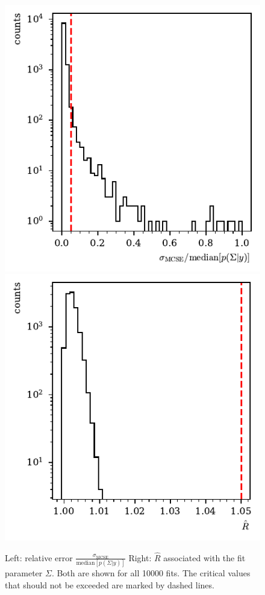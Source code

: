 \begin{figure}[htbp]
	\includegraphics[width=.49\linewidth]{../bayes/toyMC/plots/toyMC_mcse_hist.pdf}
	\includegraphics[width=.49\linewidth]{../bayes/toyMC/plots/toyMC_rhat_hist.pdf}
	\caption{ Left: relative error $\frac{\sigma_\text{MCSE}}{\text{median}\left[p\left(\Sigma|y\right)\right]}$ Right: $\widehat{R}$ associated with the fit parameter $\Sigma$. Both are shown for all 10000 fits. The critical values that should not be exceeded are marked by dashed lines.}
	\label{fig:toyMC_diagnostics}
\end{figure}
